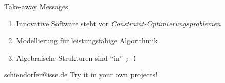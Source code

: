 \begin{frame}{Take-away Messages}
\begin{parchment}
\centering 
\begin{enumerate}
\item Innovative Software steht vor \emph{Constraint-Optimierungsproblemen}
\vspace*{1ex}
\item Modellierung für leistungsfähige Algorithmik
\vspace*{1ex}
\item Algebraische Strukturen sind ``in'' \texttt{;-)}
\end{enumerate}
\end{parchment}

\url{schiendorfer@isse.de} \hfill Try it in your own projects!
\end{frame}